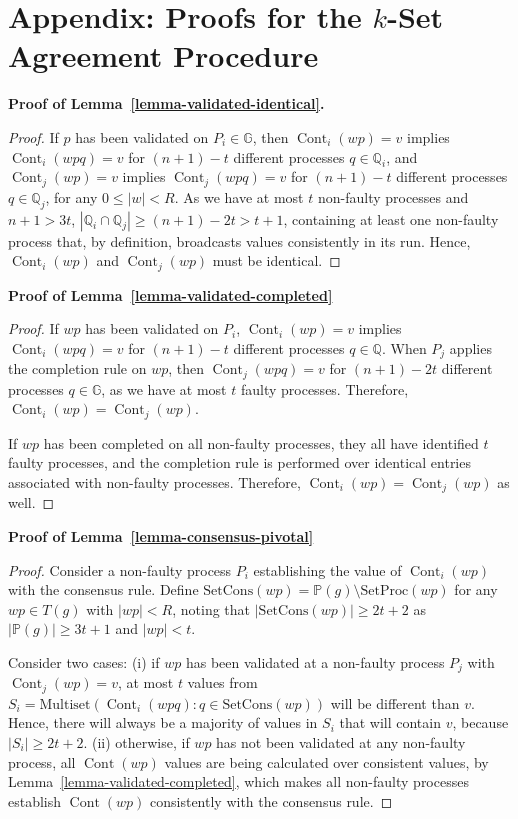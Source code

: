 \documentclass[11pt]{article}
\newcommand{\bbG}{\ensuremath{\mathbb{G}}}
\newcommand{\bbP}{\ensuremath{\mathbb{P}}}
\newcommand{\bbQ}{\ensuremath{\mathbb{Q}}}
\newcommand{\setproc}[1]{\textrm{SetProc}({#1})}
\newcommand{\setcons}[1]{\textrm{SetCons}({#1})}
\DeclareMathOperator{\cont}{Cont}
\begin{document}
\section{Appendix: Proofs for the $k$-Set Agreement Procedure}
\label{App-ProofsAlgorithm}

\noindent \textbf{Proof of Lemma~\ref{lemma-validated-identical}.}
\begin{proof}
If $p$ has been validated on $P_i \in \bbG$,
then $\cont_i(wp) = v$ implies $\cont_i(wpq) = v$ for $(n + 1) - t$ different processes $q \in \bbQ_i$,
and $\cont_j(wp) = v$ implies $\cont_j(wpq) = v$ for $(n + 1) - t$ different processes $q \in \bbQ_j$,
for any $0 \le |w| < R$.
As we have at most $t$ non-faulty processes and $n + 1 > 3t$,
$|\bbQ_i \cap \bbQ_j| \ge (n + 1) - 2t > t + 1$,
containing at least one non-faulty process that,
by definition,
broadcasts values consistently in its run.
Hence, $\cont_i(wp)$ and $\cont_j(wp)$ must be identical.
\end{proof}

\noindent \textbf{Proof of Lemma~\ref{lemma-validated-completed}}
\begin{proof}
If $wp$ has been validated on $P_i$,
$\cont_i(wp) = v$ implies $\cont_i(wpq) = v$ for $(n + 1) - t$ different processes $q \in \bbQ$.
When $P_j$ applies the completion rule on $wp$,
then $\cont_j(wpq) = v$ for $(n + 1) - 2t$ different processes $q \in \bbG$,
as we have at most $t$ faulty processes.
Therefore,
$\cont_i(wp) = \cont_j(wp)$.

If $wp$ has been completed on all non-faulty processes,
they all have identified $t$ faulty processes,
and the completion rule is performed over identical entries associated with non-faulty processes.
Therefore,
$\cont_i(wp) = \cont_j(wp)$ as well.
\end{proof}

\noindent \textbf{Proof of Lemma~\ref{lemma-consensus-pivotal}}
\begin{proof}
Consider a non-faulty process $P_i$ establishing the value of $\cont_i(wp)$
with the consensus rule.
Define $\setcons{wp} = \bbP(g) \setminus \setproc{wp}$ for any $wp \in T(g)$ with $|wp| < R$,
noting that $|\setcons{wp}| \ge 2t + 2$ as $|\bbP(g)| \ge 3t + 1$ and $|wp| < t$.

Consider two cases:
(i) if $wp$ has been validated at a non-faulty process $P_j$ with $\cont_j(wp) = v$,
at most $t$ values from $S_i = \mathrm{Multiset}(\cont_i(wpq): q \in \setcons{wp})$
will be different than $v$.
Hence, there will always be a majority of values in $S_i$ that will contain $v$,
because $|S_i| \ge 2t + 2$.
(ii) otherwise, if $wp$ has not been validated at any non-faulty process,
all $\cont(wp)$ values are being calculated over consistent values,
by Lemma~\ref{lemma-validated-completed},
which makes all non-faulty processes establish $\cont(wp)$ consistently with the consensus rule.
\end{proof}
\end{document}
